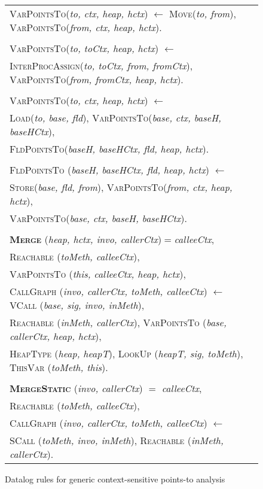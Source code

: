 \begin{figure}[t]
\begin{tabularx}{\textwidth}{|X|}
  {\textsc{VarPointsTo}(\emph{to, ctx, heap, hctx}) 
    $\leftarrow$  
    \textsc{Move}(\emph{to, from}),
    \textsc{VarPointsTo}(\emph{from, ctx, heap, hctx}).}\\
  \\
  {\textsc{VarPointsTo}(\emph{to, toCtx, heap, hctx})
    $\leftarrow$} \\
  \quad		\textsc{InterProcAssign}(\emph{to, toCtx, from, fromCtx}),
  \textsc{VarPointsTo}(\emph{from, fromCtx, heap, hctx}).\\
  \\
  {\textsc{VarPointsTo}(\emph{to, ctx, heap, hctx}) $\leftarrow$}\\
  \quad		\textsc{Load}(\emph{to, base, fld}),
  \textsc{VarPointsTo}(\emph{base, ctx, baseH, baseHCtx}), \\
  \quad \textsc{FldPointsTo}(\emph{baseH, baseHCtx, fld, heap,
    hctx}).\\
  \\	
  \textsc{FldPointsTo} (\emph{baseH, baseHCtx, fld,
    heap, hctx}) $\leftarrow$\\
  \quad		\textsc{Store}(\emph{base, fld, from}),
  \textsc{VarPointsTo}(\emph{from, ctx, heap, hctx}), \\
\quad  \textsc{VarPointsTo}(\emph{base, ctx, baseH, baseHCtx}).\\
  \\	
  \textbf{\textsc{Merge}} (\emph{heap, hctx, invo,
    callerCtx})$=$\emph{calleeCtx}, \\
  \textsc{Reachable} (\emph{toMeth, calleeCtx}), \\
  \textsc{VarPointsTo} (\emph{this, calleeCtx,
    heap, hctx}), \\
  \textsc{CallGraph} (\emph{invo, callerCtx,
    toMeth, calleeCtx})
  $\leftarrow$ \textsc{VCall} (\emph{base, sig, invo, inMeth}), \\
  \quad		
  \textsc{Reachable} (\emph{inMeth, callerCtx}),
  \textsc{VarPointsTo} (\emph{base, callerCtx, heap, hctx}), \\
  \quad		\textsc{HeapType} (\emph{heap, heapT}),
  \textsc{LookUp} (\emph{heapT, sig, toMeth}),
  \textsc{ThisVar} (\emph{toMeth, this}).\\
  \\
  \textbf{\textsc{MergeStatic}} (\emph{invo,
    callerCtx}) $=$ \emph{calleeCtx}, \\
  \textsc{Reachable} (\emph{toMeth, calleeCtx}), \\
  \textsc{CallGraph} (\emph{invo, callerCtx,
    toMeth, calleeCtx})
  $\leftarrow$ \\
  \quad \textsc{SCall} (\emph{toMeth, invo, inMeth}),
  \textsc{Reachable} (\emph{inMeth, callerCtx}).\\
  \hline
\end{tabularx}
\caption{Datalog rules for generic context-sensitive points-to analysis}
\label{fig:pointsto}
\end{figure}

